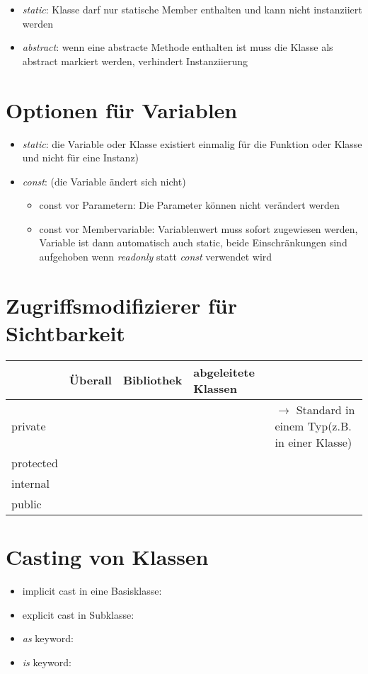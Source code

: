 \begin{itemize}
\item \emph{static}: Klasse darf nur statische Member enthalten und kann nicht instanziiert werden 
\item \emph{abstract}: wenn eine abstracte Methode enthalten ist muss die Klasse als abstract markiert werden, verhindert Instanziierung
\end{itemize}

\section{Optionen für Variablen}
\begin{itemize}
\item \emph{static}: die Variable oder Klasse existiert einmalig für die Funktion oder Klasse und nicht für eine Instanz)
\item \emph{const}: (die Variable ändert sich nicht)
\begin{itemize}
\item const vor Parametern: Die Parameter können nicht verändert werden
\item const vor Membervariable: Variablenwert muss sofort zugewiesen werden, Variable ist dann automatisch auch static, beide Einschränkungen sind aufgehoben wenn \emph{readonly} statt \emph{const} verwendet wird 
\end{itemize}
\end{itemize}

\section{Zugriffsmodifizierer für Sichtbarkeit}

\begin{tabular}{L{.15} | L{.15} L{.15} L{.15} L{.4}}
& Überall & Bibliothek & abgeleitete Klassen & \\\hline
private & ~ & ~ & ~ & $\to$ Standard in einem Typ\newline(z.B. in einer Klasse)\\
protected & ~ & ~ & ~ & ~\\
internal & ~ & ~ & ~ & ~\\
public & ~ & ~ & ~ & ~\\
\end{tabular}

\section{Casting von Klassen}
\begin{itemize}
\item implicit cast in eine Basisklasse: 
\item explicit cast in Subklasse: 
\item \emph{as} keyword: 
\item \emph{is} keyword: 
\end{itemize}
